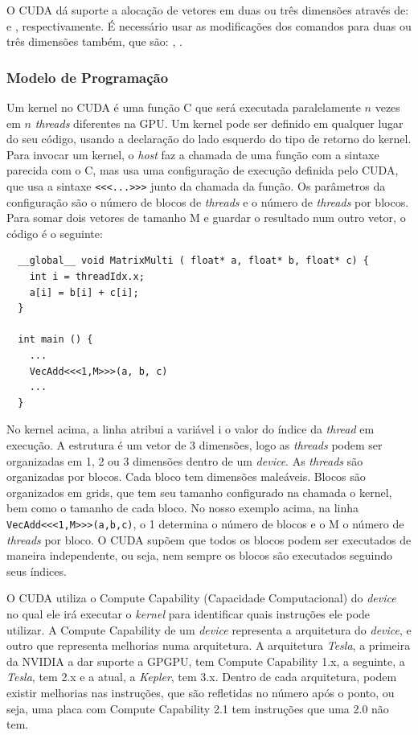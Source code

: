 O CUDA dá suporte a alocação de vetores em duas ou três dimensões através de:  e
, respectivamente. É necessário usar as modificações dos comandos  para
duas ou três dimensões também, que são: , .

\subsubsection{Modelo de Programação}
Um kernel no CUDA é uma função C que será executada paralelamente $n$ vezes em $n$ \textit{threads} diferentes na GPU. Um kernel pode ser
definido em qualquer lugar do seu código, usando a declaração  do lado esquerdo do tipo de retorno do kernel.
Para invocar um kernel, o \textit{host} faz a chamada de uma função com a sintaxe parecida com o C, mas usa uma configuração de
execução definida pelo CUDA, que usa a sintaxe \verb#<<<...>>># junto da chamada da função. Os parâmetros da configuração são
o número de blocos de \textit{threads} e o número de \textit{threads} por blocos. Para somar dois vetores de tamanho M e guardar o resultado num
outro vetor, o código é o seguinte:

\begin{lstlisting}
  __global__ void MatrixMulti ( float* a, float* b, float* c) {
    int i = threadIdx.x;
    a[i] = b[i] + c[i];
  }

  int main () {
    ...
    VecAdd<<<1,M>>>(a, b, c)
    ...
  }
\end{lstlisting}

No kernel acima, a linha  atribui a variável i o valor do índice da \textit{thread} em execução.
A estrutura  é um vetor de 3 dimensões, logo as \textit{threads} podem ser organizadas em 1, 2 ou 3 dimensões dentro de um
\textit{device}. As \textit{threads} são organizadas por blocos. Cada bloco tem dimensões maleáveis. Blocos são organizados em
grids, que tem seu tamanho configurado na chamada o kernel, bem como o tamanho de cada bloco. No nosso exemplo acima, na linha
\verb#VecAdd<<<1,M>>>(a,b,c)#, o 1 determina o número de blocos e o M o número de \textit{threads} por bloco.
O CUDA supõem que todos os blocos podem ser executados de maneira independente,
ou seja, nem sempre os blocos são executados seguindo seus índices.

O CUDA utiliza o Compute Capability (Capacidade Computacional) do \textit{device} no qual ele irá executar o \textit{kernel}
para identificar quais instruções ele pode utilizar. A Compute Capability de um \textit{device}
representa a arquitetura do \textit{device}, e outro que representa melhorias numa arquitetura.
A arquitetura \textit{Tesla}, a primeira da NVIDIA a dar suporte a GPGPU, tem Compute Capability 1.x, a seguinte, a \textit{Tesla},
tem 2.x e a atual, a \textit{Kepler}, tem 3.x. Dentro de cada arquitetura, podem existir melhorias nas instruções, que são
refletidas no número após o ponto, ou seja, uma placa com Compute Capability 2.1 tem instruções que uma 2.0 não tem.

